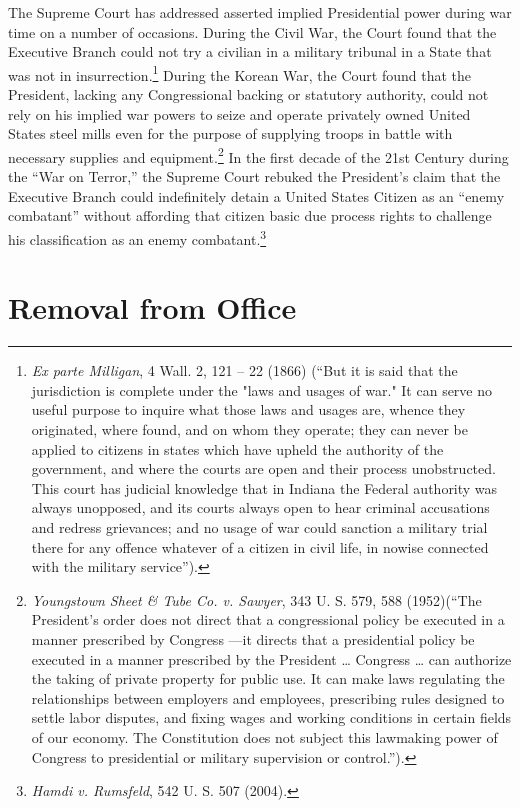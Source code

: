 The Supreme Court has addressed asserted implied Presidential power during war time on a number of occasions.
During the Civil War, the Court found that the Executive Branch could not try a civilian in a military tribunal in a State that was not in insurrection.\footnote{\textit{Ex parte Milligan}, 4 Wall. 2, 121 -- 22 (1866) (``But it is said that the jurisdiction is complete under the "laws and usages of war."  It can serve no useful purpose to inquire what those laws and usages are, whence they originated, where found, and on whom they operate; they can never be applied to citizens in states which have upheld the authority of the government, and where the courts are open and their process unobstructed. This court has judicial knowledge that in Indiana the Federal authority was always unopposed, and its courts always open to hear criminal accusations and redress grievances; and no usage of war could sanction a military trial there for any offence whatever of a citizen in civil life, in nowise connected with the military service'').}
During the Korean War, the Court found that the President, lacking any Congressional backing or statutory authority, could not rely on his implied war powers to seize and operate privately owned United States steel mills even for the purpose of supplying troops in battle with necessary supplies and equipment.\footnote{\textit{Youngstown Sheet \& Tube Co. v. Sawyer}, 343 U. S. 579, 588 (1952)(``The President's order does not direct that a congressional policy be executed in a manner prescribed by Congress —it directs that a presidential policy be executed in a manner prescribed by the President … Congress … can authorize the taking of private property for public use. It can make laws regulating the relationships between employers and employees, prescribing rules designed to settle labor disputes, and fixing wages and working conditions in certain fields of our economy. The Constitution does not subject this lawmaking power of Congress to presidential or military supervision or control.'').}
In the first decade of the 21st Century during the ``War on Terror,'' the Supreme Court rebuked the President's claim that the Executive Branch could indefinitely detain a United States Citizen as an ``enemy combatant'' without affording that citizen basic due process rights to challenge his classification as an enemy combatant.\footnote{\textit{Hamdi v. Rumsfeld}, 542 U. S. 507 (2004).}

\section{Removal from Office}

